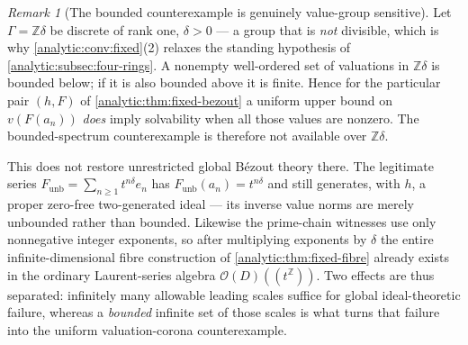 \documentclass[11pt,letterpaper]{article}
\theoremstyle{definition}
\theoremstyle{remark}
\newtheorem{remark}[theorem]{Remark}
\newcommand{\Z}{\mathbb Z}
\newcommand{\OO}{\mathcal O}
\numberwithin{equation}{section}
\begin{document}
\begin{remark}[The bounded counterexample is genuinely value-group
sensitive]\label{analytic:rem:fixed-value-group}
Let $\Gamma=\Z\delta$ be discrete of rank one, $\delta>0$ --- a group that
is \emph{not} divisible, which is why \cref{analytic:conv:fixed}(2)
relaxes the standing hypothesis of \cref{analytic:subsec:four-rings}. A
nonempty well-ordered set of valuations in $\Z\delta$ is bounded below; if
it is also bounded above it is finite. Hence for the particular pair
$(h,F)$ of \cref{analytic:thm:fixed-bezout} a uniform upper bound on
$v(F(a_n))$ \emph{does} imply solvability when all those values are
nonzero. The bounded-spectrum counterexample is therefore not available
over $\Z\delta$.

This does not restore unrestricted global B\'ezout theory there. The
legitimate series $F_{\mathrm{unb}}=\sum_{n\ge1}t^{n\delta}e_n$ has
$F_{\mathrm{unb}}(a_n)=t^{n\delta}$ and still generates, with $h$, a
proper zero-free two-generated ideal --- its inverse value norms are
merely unbounded rather than bounded. Likewise the prime-chain witnesses
use only nonnegative integer exponents, so after multiplying exponents by
$\delta$ the entire infinite-dimensional fibre construction of
\cref{analytic:thm:fixed-fibre} already exists in the ordinary
Laurent-series algebra $\OO(D)((t^\Z))$. Two effects are thus separated:
infinitely many allowable leading scales suffice for global
ideal-theoretic failure, whereas a \emph{bounded} infinite set of those
scales is what turns that failure into the uniform valuation-corona
counterexample.
\end{remark}
\end{document}
